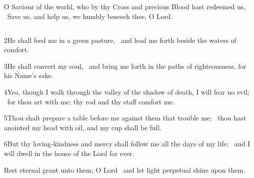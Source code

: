
 O Saviour of the world, who by thy Cross and precious Blood hast redeemed us, \star\ Save us, and help us, we humbly beseech thee, O Lord.




\subsection[{Psalm 23}]{}

2\enspace He shall feed me in a green pasture, \star\ and lead me forth beside the waters of comfort.

3\enspace He shall convert my soul, \star\ and bring me forth in the paths of righteousness, for his Name’s sake.

4\enspace Yea, though I walk through the valley of the shadow of death, I will fear no evil; \star\ for thou art with me; thy rod and thy staff comfort me.

5\enspace Thou shalt prepare a table before me against them that trouble me; \star\ thou hast anointed my head with oil, and my cup shall be full.

6\enspace But thy loving-kindness and mercy shall follow me all the days of my life; \star\ and I will dwell in the house of the Lord for ever.

Rest eternal grant unto them, O Lord \star\ and let light perpetual shine upon them.


\subsection[{Psalm 39}]{}

